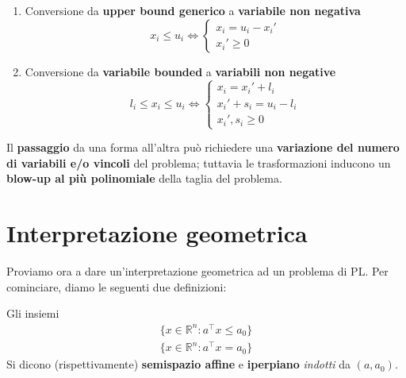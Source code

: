 \begin{enumerate}
\[        \] 
    \item Conversione da \textbf{upper bound generico} a \textbf{variabile non negativa}
        \[
            x_i \le u_i \Longleftrightarrow \begin{cases}
                x_i = u_i - x_i' \\
                x_i' \ge0
            \end{cases}
        \]
    \item Conversione da \textbf{variabile bounded} a \textbf{variabili non negative}
        \[
            l_i \le  x_i \le u_i \Longleftrightarrow \begin{cases}
                x_i = x_i' + l_i \\
                x_i' + s_i = u_i - l_i \\
                x_i', s_i \ge0
            \end{cases}
        \] 
\end{enumerate}

\begin{warn}
    Il \textbf{passaggio} da una forma all’altra può richiedere una 
    \textbf{variazione del numero di variabili e/o vincoli} del problema; tuttavia
    le trasformazioni inducono un \textbf{blow-up al più polinomiale} della 
    taglia del problema.
\end{warn}

\section{Interpretazione geometrica}

Proviamo ora a dare un'interpretazione geometrica ad un problema di PL.
Per cominciare, diamo le seguenti due definizioni:

\begin{definition}
    Gli insiemi
    \[
        \begin{aligned}
            \{x\in \mathbb{R}^n : a^\top x \le a_0 \} \\ 
            \{x\in \mathbb{R}^n : a^\top x = a_0\}  
        \end{aligned}
    \] 
    Si dicono (rispettivamente) \textbf{semispazio affine} e \textbf{iperpiano}
    \textit{indotti} da $(a,a_0)$.
\end{definition}

